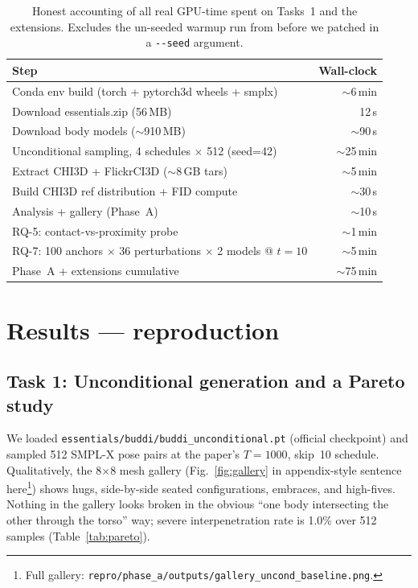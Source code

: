\documentclass[10pt]{article}
\begin{document}
\begin{table}[H]
\centering
\small
\begin{tabular}{lr}
\toprule
Step & Wall-clock \\
\midrule
Conda env build (torch + pytorch3d wheels + smplx) & $\sim$6\,min \\
Download essentials.zip (56\,MB) & 12\,s \\
Download body models ($\sim$910\,MB) & $\sim$90\,s \\
Unconditional sampling, 4 schedules $\times$ 512 (seed=42) & $\sim$25\,min \\
Extract CHI3D + FlickrCI3D ($\sim$8\,GB tars) & $\sim$5\,min \\
Build CHI3D ref distribution + FID compute & $\sim$30\,s \\
Analysis + gallery (Phase~A) & $\sim$10\,s \\
RQ-5: contact-vs-proximity probe & $\sim$1\,min \\
RQ-7: 100 anchors $\times$ 36 perturbations $\times$ 2 models @ $t{=}10$ & $\sim$5\,min \\
\midrule
Phase~A + extensions cumulative & $\sim$75\,min \\
\bottomrule
\end{tabular}
\caption{Honest accounting of all real GPU-time spent on Tasks~1 and the extensions. Excludes the un-seeded warmup run from before we patched in a \texttt{-{}-seed} argument.}
\label{tab:compute}
\end{table}

\section{Results --- reproduction}

\subsection{Task 1: Unconditional generation and a Pareto study}
\label{sec:task1}

We loaded \texttt{essentials/buddi/buddi\_unconditional.pt} (official checkpoint) and sampled 512 SMPL-X pose pairs at the paper's $T{=}1000$, skip~10 schedule. Qualitatively, the 8$\times$8 mesh gallery (Fig.~\ref{fig:gallery} in appendix-style sentence here\footnote{Full gallery: \texttt{repro/phase\_a/outputs/gallery\_uncond\_baseline.png}.}) shows hugs, side-by-side seated configurations, embraces, and high-fives. Nothing in the gallery looks broken in the obvious ``one body intersecting the other through the torso'' way; severe interpenetration rate is 1.0\% over 512 samples (Table~\ref{tab:pareto}).
\end{document}

